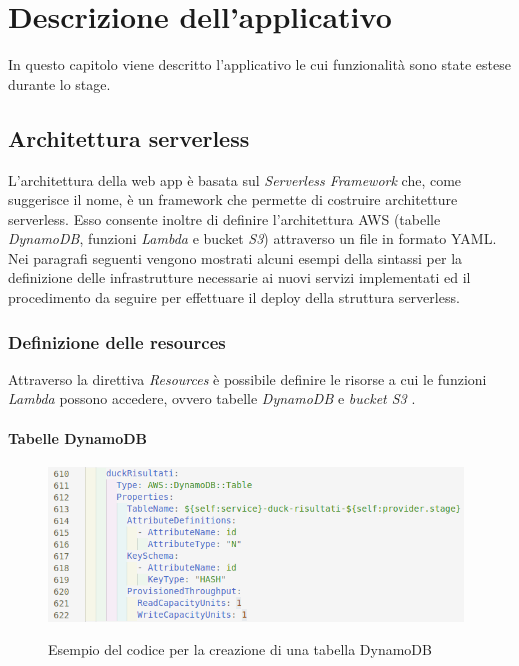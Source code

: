 
\chapter{Descrizione dell'applicativo}
\label{cap:applicazione}

In questo capitolo viene descritto l'applicativo le cui funzionalità sono state estese durante lo stage.\\

\section{Architettura serverless}
L'architettura della web app è basata sul \emph{Serverless Framework} che, come suggerisce il nome, è un \gls{framework} che permette di costruire architetture \gls{serverless}. Esso consente inoltre di definire l'architettura \gls{AWS} (tabelle \emph{DynamoDB}, funzioni \emph{Lambda} e bucket \emph{S3}) attraverso un file in formato \gls{YAML}. \\
 Nei paragrafi seguenti vengono mostrati alcuni esempi della sintassi per la definizione delle infrastrutture necessarie ai nuovi servizi implementati ed il procedimento da seguire per effettuare il \gls{deploy} della struttura \gls{serverless}.
	\subsection{Definizione delle resources}
	Attraverso la direttiva \emph{ Resources} è possibile definire le risorse a cui le funzioni \emph{Lambda} possono accedere, ovvero tabelle \emph{DynamoDB} e \emph{bucket S3} .
	
		\subsubsection{Tabelle DynamoDB}
		\begin{figure}[H]
			\centering
			\includegraphics[width=11cm]{immagini/tabellaDB.png} \\
			\caption{\label{fig:tabellaDB} Esempio del codice per la creazione di una tabella DynamoDB}
		\end{figure}
		
